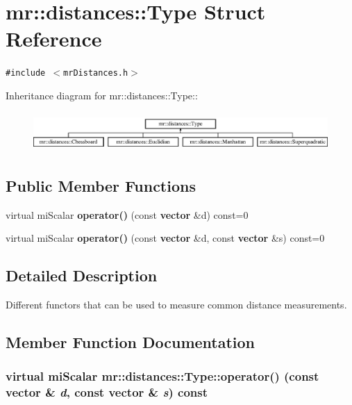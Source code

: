 \section{mr::distances::Type Struct Reference}
\label{structmr_1_1distances_1_1Type}
{\tt \#include $<$mr\-Distances.h$>$}

Inheritance diagram for mr::distances::Type::\begin{figure}[H]
\begin{center}
\leavevmode
\includegraphics[height=1.51351cm]{structmr_1_1distances_1_1Type}
\end{center}
\end{figure}
\subsection*{Public Member Functions}
\begin{CompactItemize}
\item 
virtual mi\-Scalar {\bf operator()} (const {\bf vector} \&d) const=0
\item 
virtual mi\-Scalar {\bf operator()} (const {\bf vector} \&d, const {\bf vector} \&s) const=0
\end{CompactItemize}


\subsection{Detailed Description}
Different functors that can be used to measure common distance measurements. 



\subsection{Member Function Documentation}
\subsubsection{\setlength{\rightskip}{0pt plus 5cm}virtual mi\-Scalar mr::distances::Type::operator() (const {\bf vector} \& {\em d}, const {\bf vector} \& {\em s}) const\hspace{0.3cm}{\tt  [pure virtual]}}\label{structmr_1_1distances_1_1Type_a1}




